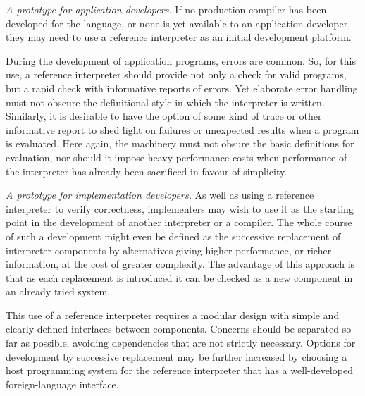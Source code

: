 \vspace{.5\baselineskip}
\noindent
\emph{A prototype for application developers.}
If no production compiler has been developed for the language,
or none is yet available to an application developer,
they may need to use a reference interpreter as
an initial development platform.

During the development of application programs, errors
are common.
So, for this use, a reference interpreter should provide
not only a check for valid programs, but a rapid check
with informative reports of errors.
Yet elaborate error handling must not obscure the
definitional style in which the interpreter is written.
Similarly, it is desirable to have the option of some
kind of trace or other informative report to shed
light on failures or unexpected results when a program
is evaluated.
Here again, the machinery must not obsure the basic
definitions for evaluation, nor should it impose heavy
performance costs when performance of the interpreter
has already been sacrificed in favour of simplicity.

\vspace{.5\baselineskip}
\noindent
\emph{A prototype for implementation developers.}
As well as using a reference interpreter to verify correctness,
implementers may wish to use it as the starting point in the
development of another interpreter or a compiler.
The whole course of such a development might even be defined as
the successive replacement of interpreter components by
alternatives giving higher performance, or richer information,
at the cost of greater complexity.
The advantage of this approach is that as each replacement
is introduced it can be checked as a new component in an already
tried system.

This use of a reference interpreter requires a
modular design with simple and clearly defined interfaces
between components.
Concerns should be separated so far as possible, avoiding
dependencies that are not strictly necessary.
Options for development by successive replacement may be further
increased by choosing a host programming system for the reference
interpreter that has a well-developed foreign-language interface. 

